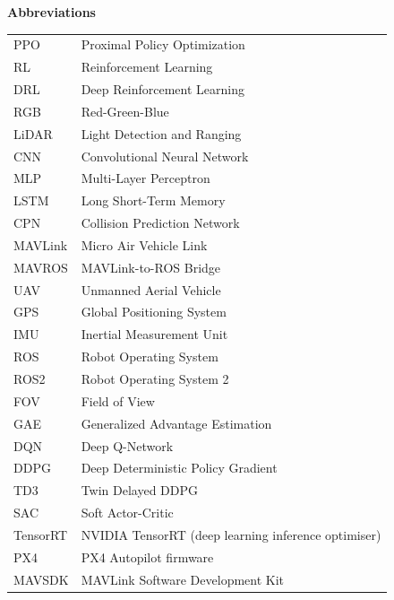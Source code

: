\documentclass[../main.tex]{subfiles}
\begin{document}
\raggedright\textbf{Abbreviations}\\[6pt]

\begin{tabular}{ll}
    PPO    & Proximal Policy Optimization \\
    RL     & Reinforcement Learning \\
    DRL    & Deep Reinforcement Learning \\
    RGB    & Red-Green-Blue \\
    LiDAR  & Light Detection and Ranging \\
    CNN    & Convolutional Neural Network \\
    MLP    & Multi-Layer Perceptron \\
    LSTM   & Long Short-Term Memory \\
    CPN    & Collision Prediction Network \\
    MAVLink & Micro Air Vehicle Link \\
    MAVROS & MAVLink-to-ROS Bridge \\
    UAV    & Unmanned Aerial Vehicle \\
    GPS    & Global Positioning System \\
    IMU    & Inertial Measurement Unit \\
    ROS    & Robot Operating System \\
    ROS2   & Robot Operating System 2 \\
    FOV    & Field of View \\
    GAE    & Generalized Advantage Estimation \\
    DQN    & Deep Q-Network \\
    DDPG   & Deep Deterministic Policy Gradient \\
    TD3    & Twin Delayed DDPG \\
    SAC    & Soft Actor-Critic \\
    TensorRT & NVIDIA TensorRT (deep learning inference optimiser) \\
    PX4    & PX4 Autopilot firmware \\
    MAVSDK & MAVLink Software Development Kit \\
\end{tabular}
\end{document}
